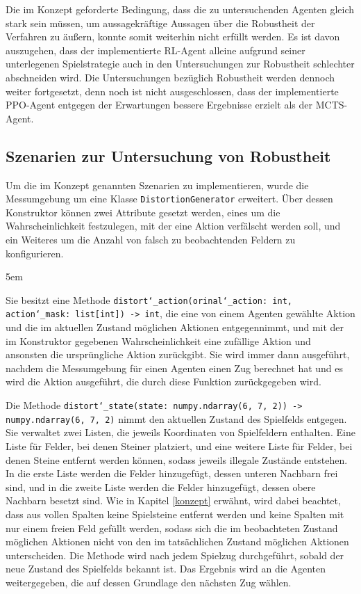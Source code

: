 Die im Konzept geforderte Bedingung, dass die zu untersuchenden Agenten gleich stark sein müssen, um aussagekräftige Aussagen über die Robustheit der Verfahren zu äußern, konnte somit weiterhin nicht erfüllt werden. Es ist davon auszugehen, dass der implementierte RL-Agent alleine aufgrund seiner unterlegenen Spielstrategie auch in den Untersuchungen zur Robustheit schlechter abschneiden wird. Die Untersuchungen bezüglich Robustheit werden dennoch weiter fortgesetzt, denn noch ist nicht ausgeschlossen, dass der implementierte PPO-Agent entgegen der Erwartungen bessere Ergebnisse erzielt als der MCTS-Agent.

\subsection{Szenarien zur Untersuchung von Robustheit}

\label{robustheit-szenarien}

Um die im Konzept genannten Szenarien zu implementieren, wurde die Messumgebung um eine Klasse \texttt{DistortionGenerator} erweitert. Über dessen Konstruktor können zwei Attribute gesetzt werden, eines um die Wahrscheinlichkeit festzulegen, mit der eine Aktion verfälscht werden soll, und ein Weiteres um die Anzahl von falsch zu beobachtenden Feldern zu konfigurieren.


\begingroup

\emergencystretch 5em%

	 Sie besitzt eine Methode \texttt{distort\char`_action(orinal\char`_action: int, action\char`_mask: list[int]) -> int}, die eine von einem Agenten gewählte Aktion und die im aktuellen Zustand möglichen Aktionen entgegennimmt, und mit der im Konstruktor gegebenen Wahrscheinlichkeit eine zufällige Aktion und ansonsten die ursprüngliche Aktion zurückgibt. Sie wird immer dann ausgeführt, nachdem die Messumgebung für einen Agenten einen Zug berechnet hat und es wird die Aktion ausgeführt, die durch diese Funktion zurückgegeben wird.

	Die Methode \texttt{distort\char`_state(state: numpy.ndarray(6, 7, 2)) -> numpy.ndarray(6, 7, 2)} nimmt den aktuellen Zustand des Spielfelds entgegen. Sie verwaltet zwei Listen, die jeweils Koordinaten von Spielfeldern enthalten. Eine Liste für Felder, bei denen Steiner platziert, und eine weitere Liste für Felder, bei denen Steine entfernt werden können, sodass jeweils illegale Zustände entstehen. In die erste Liste werden die Felder hinzugefügt, dessen unteren Nachbarn frei sind, und in die zweite Liste werden die Felder hinzugefügt, dessen obere Nachbarn besetzt sind. Wie in Kapitel \ref{konzept} erwähnt, wird dabei beachtet, dass aus vollen Spalten keine Spielsteine entfernt werden und keine Spalten mit nur einem freien Feld gefüllt werden, sodass sich die im beobachteten Zustand möglichen Aktionen nicht von den im tatsächlichen Zustand möglichen Aktionen unterscheiden. Die Methode wird nach jedem Spielzug durchgeführt, sobald der neue Zustand des Spielfelds bekannt ist. Das Ergebnis wird an die Agenten weitergegeben, die auf dessen Grundlage den nächsten Zug wählen.

